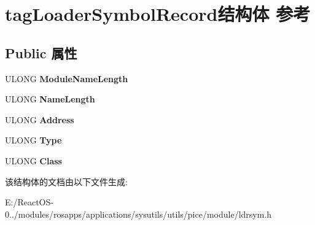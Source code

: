 \hypertarget{structtag_loader_symbol_record}{}\section{tag\+Loader\+Symbol\+Record结构体 参考}
\label{structtag_loader_symbol_record}
\subsection*{Public 属性}
\begin{DoxyCompactItemize}
\item 
\mbox{\label{structtag_loader_symbol_record_a9f365ee940fe05cc4359a725e5dd2730}} 
U\+L\+O\+NG {\bfseries Module\+Name\+Length}
\item 
\mbox{\label{structtag_loader_symbol_record_a1f228b2d67d1292be5ffb43c598c02e3}} 
U\+L\+O\+NG {\bfseries Name\+Length}
\item 
\mbox{\label{structtag_loader_symbol_record_aaacacd4a965e6cefb7b97136b6f3480f}} 
U\+L\+O\+NG {\bfseries Address}
\item 
\mbox{\label{structtag_loader_symbol_record_a4fa08f3ab40c5af739b6ae072374a26c}} 
U\+L\+O\+NG {\bfseries Type}
\item 
\mbox{\label{structtag_loader_symbol_record_a1155a44ba0f3fcfe1162f838b4fd12e7}} 
U\+L\+O\+NG {\bfseries Class}
\end{DoxyCompactItemize}


该结构体的文档由以下文件生成\+:\begin{DoxyCompactItemize}
\item 
E\+:/\+React\+O\+S-\/0../modules/rosapps/applications/sysutils/utils/pice/module/ldrsym.\+h\end{DoxyCompactItemize}
